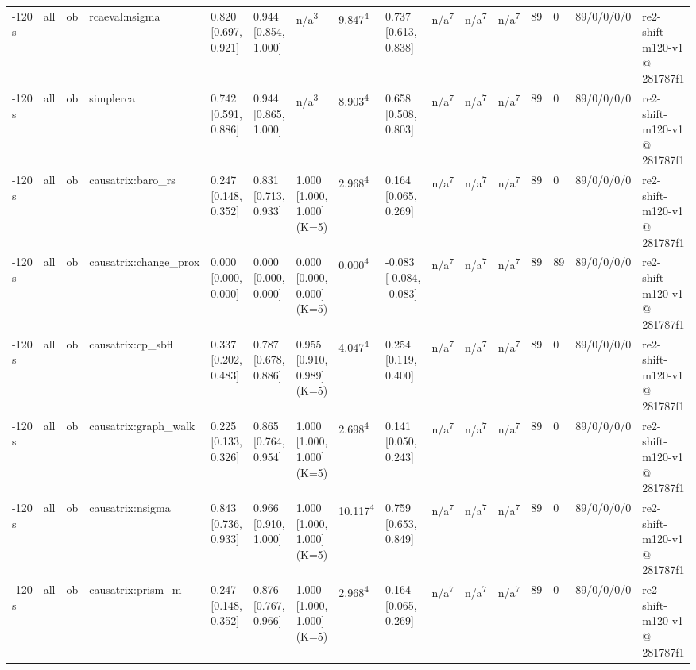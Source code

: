 \begin{table}[t]
\begin{tabular}{llllllllllllllll}
-120 s & all & ob & rcaeval:nsigma & 0.820 [0.697, 0.921] & 0.944 [0.854, 1.000] & n/a\textsuperscript{3} & 9.847\textsuperscript{4} & 0.737 [0.613, 0.838] & n/a\textsuperscript{7} & n/a\textsuperscript{7} & n/a\textsuperscript{7} & 89 & 0 & 89/0/0/0/0 & re2-shift-m120-v1 @ 281787f1 \\
-120 s & all & ob & simplerca & 0.742 [0.591, 0.886] & 0.944 [0.865, 1.000] & n/a\textsuperscript{3} & 8.903\textsuperscript{4} & 0.658 [0.508, 0.803] & n/a\textsuperscript{7} & n/a\textsuperscript{7} & n/a\textsuperscript{7} & 89 & 0 & 89/0/0/0/0 & re2-shift-m120-v1 @ 281787f1 \\
-120 s & all & ob & causatrix:baro\_rs & 0.247 [0.148, 0.352] & 0.831 [0.713, 0.933] & 1.000 [1.000, 1.000] (K=5) & 2.968\textsuperscript{4} & 0.164 [0.065, 0.269] & n/a\textsuperscript{7} & n/a\textsuperscript{7} & n/a\textsuperscript{7} & 89 & 0 & 89/0/0/0/0 & re2-shift-m120-v1 @ 281787f1 \\
-120 s & all & ob & causatrix:change\_prox & 0.000 [0.000, 0.000] & 0.000 [0.000, 0.000] & 0.000 [0.000, 0.000] (K=5) & 0.000\textsuperscript{4} & -0.083 [-0.084, -0.083] & n/a\textsuperscript{7} & n/a\textsuperscript{7} & n/a\textsuperscript{7} & 89 & 89 & 89/0/0/0/0 & re2-shift-m120-v1 @ 281787f1 \\
-120 s & all & ob & causatrix:cp\_sbfl & 0.337 [0.202, 0.483] & 0.787 [0.678, 0.886] & 0.955 [0.910, 0.989] (K=5) & 4.047\textsuperscript{4} & 0.254 [0.119, 0.400] & n/a\textsuperscript{7} & n/a\textsuperscript{7} & n/a\textsuperscript{7} & 89 & 0 & 89/0/0/0/0 & re2-shift-m120-v1 @ 281787f1 \\
-120 s & all & ob & causatrix:graph\_walk & 0.225 [0.133, 0.326] & 0.865 [0.764, 0.954] & 1.000 [1.000, 1.000] (K=5) & 2.698\textsuperscript{4} & 0.141 [0.050, 0.243] & n/a\textsuperscript{7} & n/a\textsuperscript{7} & n/a\textsuperscript{7} & 89 & 0 & 89/0/0/0/0 & re2-shift-m120-v1 @ 281787f1 \\
-120 s & all & ob & causatrix:nsigma & 0.843 [0.736, 0.933] & 0.966 [0.910, 1.000] & 1.000 [1.000, 1.000] (K=5) & 10.117\textsuperscript{4} & 0.759 [0.653, 0.849] & n/a\textsuperscript{7} & n/a\textsuperscript{7} & n/a\textsuperscript{7} & 89 & 0 & 89/0/0/0/0 & re2-shift-m120-v1 @ 281787f1 \\
-120 s & all & ob & causatrix:prism\_m & 0.247 [0.148, 0.352] & 0.876 [0.767, 0.966] & 1.000 [1.000, 1.000] (K=5) & 2.968\textsuperscript{4} & 0.164 [0.065, 0.269] & n/a\textsuperscript{7} & n/a\textsuperscript{7} & n/a\textsuperscript{7} & 89 & 0 & 89/0/0/0/0 & re2-shift-m120-v1 @ 281787f1 \\

\end{tabular}
\end{table}
